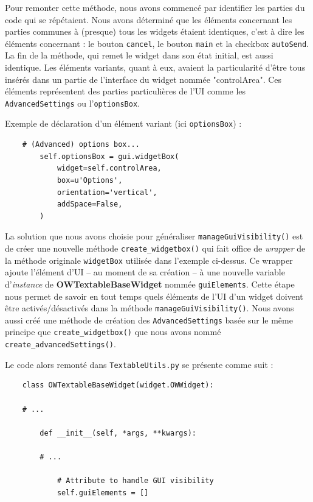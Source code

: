 \documentclass{article}
\begin{document}
{Pour remonter cette méthode, nous avons commencé par identifier les parties du code qui se répétaient. Nous avons déterminé que les éléments concernant les parties communes à (presque) tous les widgets étaient identiques, c'est à dire les éléments concernant : le bouton \texttt{cancel}, le bouton \texttt{main} et la checkbox \texttt{autoSend}. La fin de la méthode, qui remet le widget dans son état initial, est aussi identique.
Les éléments variants, quant à eux, avaient la particularité d'être tous insérés dans un partie de l'interface du widget nommée "controlArea". Ces éléments représentent des parties particulières de l'UI comme les \texttt{AdvancedSettings} ou l'\texttt{optionsBox}. 

Exemple de déclaration d'un élément variant (ici \texttt{optionsBox}) : 

\begin{verbatim}
    # (Advanced) options box...
        self.optionsBox = gui.widgetBox(
            widget=self.controlArea,
            box=u'Options',
            orientation='vertical',
            addSpace=False,
        )
\end{verbatim}

La solution que nous avons choisie pour généraliser \texttt{manageGuiVisibility()} est de créer une nouvelle méthode \texttt{create\_widgetbox()} qui fait office de \textit{wrapper} de la méthode originale \texttt{widgetBox} utilisée dans l'exemple ci-dessus. Ce wrapper ajoute l'élément d'UI – au moment de sa création – à une nouvelle variable d'\textit{instance} de \textbf{OWTextableBaseWidget} nommée \texttt{guiElements}. Cette étape nous permet de savoir en tout temps quels éléments de l'UI d'un widget doivent être activés/désactivés dans la méthode \texttt{manageGuiVisibility()}. Nous avons aussi créé une méthode de création des \texttt{AdvancedSettings} basée sur le même principe que \texttt{create\_widgetbox()} que nous avons nommé \texttt{create\_advancedSettings()}.

Le code alors remonté dans \texttt{TextableUtils.py} se présente comme suit : 

\begin{verbatim}
    class OWTextableBaseWidget(widget.OWWidget):

    # ...

        def __init__(self, *args, **kwargs):

        # ...

            # Attribute to handle GUI visibility
            self.guiElements = []


\end{verbatim}}
\end{document}

